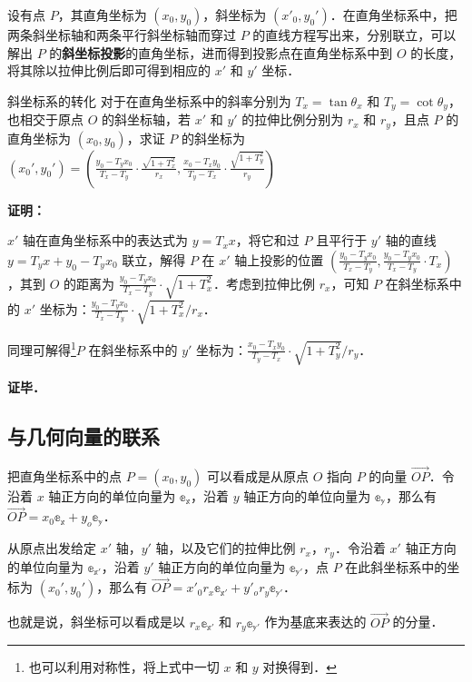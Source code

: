 设有点 $P$，其直角坐标为 $(x_0, y_0)$，斜坐标为 $(x'_0, y_0')$．在直角坐标系中，把两条斜坐标轴和两条平行斜坐标轴而穿过 $P$ 的直线方程写出来，分别联立，可以解出 $P$ 的\textbf{斜坐标投影}的直角坐标，进而得到投影点在直角坐标系中到 $O$ 的长度，将其除以拉伸比例后即可得到相应的 $x'$ 和 $y'$ 坐标．

\begin{example}{斜坐标系的转化}
对于在直角坐标系中的斜率分别为 $T_x=\tan{\theta_x}$ 和 $T_y=\cot{\theta_y}$，也相交于原点 $O$ 的斜坐标轴，若 $x'$ 和 $y'$ 的拉伸比例分别为 $r_x$ 和 $r_y$，且点 $P$ 的直角坐标为 $(x_0, y_0)$，求证 $P$ 的斜坐标为 $(x_0', y_0')=(\frac{y_0-T_yx_0}{T_x-T_y}\cdot\frac{\sqrt{1+T_x^2}}{r_x}, \frac{x_0-T_xy_0}{T_y-T_x}\cdot\frac{\sqrt{1+T_y^2}}{r_y})$
\end{example}

\textbf{证明：}

$x'$ 轴在直角坐标系中的表达式为 $y=T_xx$，将它和过 $P$ 且平行于 $y'$ 轴的直线 $y=T_yx+y_0-T_yx_0$ 联立，解得 $P$ 在 $x'$ 轴上投影的位置 $(\frac{y_0-T_yx_0}{T_x-T_y}, \frac{y_0-T_yx_0}{T_x-T_y}\cdot T_x)$，其到 $O$ 的距离为 $\frac{y_0-T_yx_0}{T_x-T_y}\cdot\sqrt{1+T_x^2}$．考虑到拉伸比例 $r_x$，可知 $P$ 在斜坐标系中的 $x'$ 坐标为：$\frac{y_0-T_yx_0}{T_x-T_y}\cdot\sqrt{1+T_x^2}/r_x$．

同理可解得\footnote{也可以利用对称性，将上式中一切 $x$ 和 $y$ 对换得到．}$P$ 在斜坐标系中的 $y'$ 坐标为：$\frac{x_0-T_xy_0}{T_y-T_x}\cdot\sqrt{1+T_y^2}/r_y$．

\textbf{证毕．}

\subsection{与几何向量的联系}

把直角坐标系中的点 $P=(x_0, y_0)$ 可以看成是从原点 $O$ 指向 $P$ 的向量 $\overrightarrow{OP}$．令沿着 $x$ 轴正方向的单位向量为 $\mathbb{e_x}$，沿着 $y$ 轴正方向的单位向量为 $\mathbb{e_y}$，那么有 $\overrightarrow{OP}=x_0\mathbb{e_x}+y_o\mathbb{e_y}$．

从原点出发给定 $x'$ 轴，$y'$ 轴，以及它们的拉伸比例 $r_x$，$r_y$．令沿着 $x'$ 轴正方向的单位向量为 $\mathbb{e_{x'}}$，沿着 $y'$ 轴正方向的单位向量为 $\mathbb{e_{y'}}$，点 $P$ 在此斜坐标系中的坐标为 $(x_0',y_0')$，那么有 $\overrightarrow{OP}=x'_0r_x\mathbb{e_{x'}}+y'_or_y\mathbb{e_{y'}}$．

也就是说，斜坐标可以看成是以 $r_x\mathbb{e_{x'}}$ 和 $r_y\mathbb{e_{y'}}$ 作为基底来表达的 $\overrightarrow{OP}$ 的分量．




